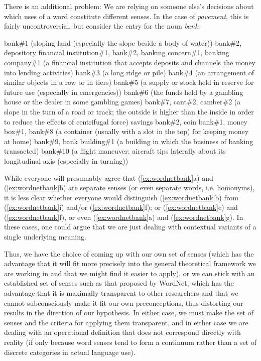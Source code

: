 There is an additional problem: We are relying on someone else's decisions about which uses of a word constitute different senses. In the case of \textit{pavement}, this is fairly uncontroversial, but consider the entry for the noun \textit{bank}:

\begin{exe}
\ex
\begin{xlist} 
\label{ex:wordnetbank}
\ex bank\#1 (sloping land (especially the slope beside a body of water))
\ex bank\#2, depository financial institution\#1, bank\#2, banking concern\#1, banking company\#1 (a financial institution that accepts deposits and channels the money into lending activities)
\ex bank\#3 (a long ridge or pile)
\ex bank\#4 (an arrangement of similar objects in a row or in tiers)
\ex bank\#5 (a supply or stock held in reserve for future use (especially in emergencies))
\ex bank\#6 (the funds held by a gambling house or the dealer in some gambling games)
\ex bank\#7, cant\#2, camber\#2 (a slope in the turn of a road or track; the outside is higher than the inside in order to reduce the effects of centrifugal force)
\ex savings bank\#2, coin bank\#1, money box\#1, bank\#8 (a container (usually with a slot in the top) for keeping money at home)
\ex bank\#9, bank building\#1 (a building in which the business of banking transacted)
\ex bank\#10 (a flight maneuver; aircraft tips laterally about its longitudinal axis (especially in turning))
\end{xlist}
\end{exe}

While everyone will presumably agree that (\ref{ex:wordnetbank}a) and (\ref{ex:wordnetbank}b) are separate senses (or even separate words, i.e. homonyms), it is less clear whether everyone would distinguish (\ref{ex:wordnetbank}b) from (\ref{ex:wordnetbank}i) and/or (\ref{ex:wordnetbank}f); or (\ref{ex:wordnetbank}e) and (\ref{ex:wordnetbank}f), or even (\ref{ex:wordnetbank}a) and (\ref{ex:wordnetbank}g). In these cases, one could argue that we are just dealing with contextual variants of a single underlying meaning.

Thus, we have the choice of coming up with our own set of senses (which has the advantage that it will fit more precisely into the general theoretical framework we are working in and that we might find it easier to apply), or we can stick with an established set of senses such as that proposed by WordNet, which has the advantage that it is maximally transparent to other researchers and that we cannot subconsciously make it fit our own preconceptions, thus distorting our results in the direction of our hypothesis. In either case, we must make the set of senses and the criteria for applying them transparent, and in either case we are dealing with an operational definition that does not correspond directly with reality (if only because word senses tend to form a continuum rather than a set of discrete categories in actual language use).

